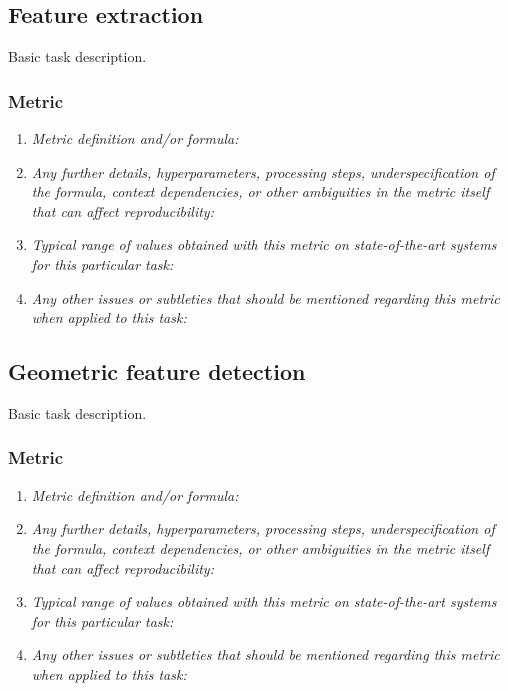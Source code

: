 \documentclass[a4paper,11pt]{article}
\begin{document}
    \subsection{Feature extraction}
        Basic task description.
        \subsubsection{Metric}
            \begin{enumerate}[label=\alph*.]
                \item \textit{Metric definition and/or formula:}
                \bigskip
                \item \textit{Any further details, hyperparameters, processing steps, underspecification of the formula, context dependencies, or other ambiguities in the metric itself that can affect reproducibility:}
                \bigskip
                \item \textit{Typical range of values obtained with this metric on state-of-the-art systems for this particular task:}
                \bigskip
                \item \textit{Any other issues or subtleties that should be mentioned regarding this metric when applied to this task:}
                \bigskip
            \end{enumerate}

    \subsection{Geometric feature detection}
        Basic task description.
        \subsubsection{Metric}
            \begin{enumerate}[label=\alph*.]
                \item \textit{Metric definition and/or formula:}
                \bigskip
                \item \textit{Any further details, hyperparameters, processing steps, underspecification of the formula, context dependencies, or other ambiguities in the metric itself that can affect reproducibility:}
                \bigskip
                \item \textit{Typical range of values obtained with this metric on state-of-the-art systems for this particular task:}
                \bigskip
                \item \textit{Any other issues or subtleties that should be mentioned regarding this metric when applied to this task:}
                \bigskip
            \end{enumerate}
\end{document}
